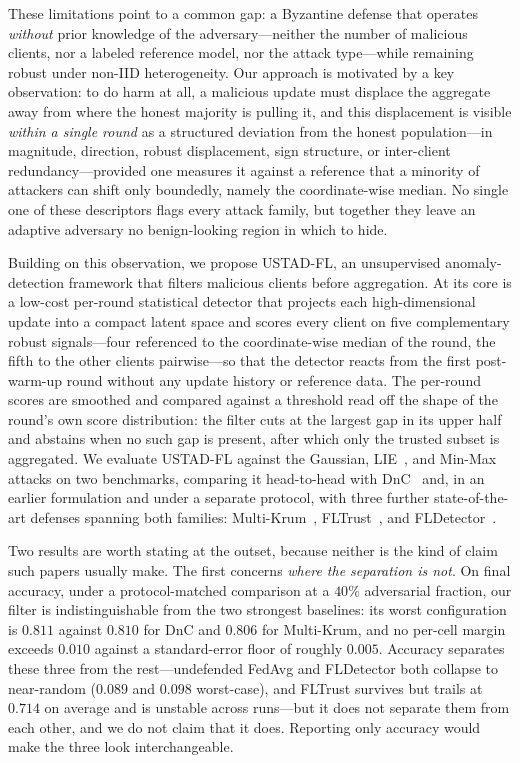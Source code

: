 \documentclass[journal]{IEEEtran}
\begin{document}
These limitations point to a common gap: a Byzantine defense that operates \emph{without} prior knowledge of the adversary---neither the number of malicious clients, nor a labeled reference model, nor the attack type---while remaining robust under non-IID heterogeneity. Our approach is motivated by a key observation: to do harm at all, a malicious update must displace the aggregate away from where the honest majority is pulling it, and this displacement is visible \emph{within a single round} as a structured deviation from the honest population---in magnitude, direction, robust displacement, sign structure, or inter-client redundancy---provided one measures it against a reference that a minority of attackers can shift only boundedly, namely the coordinate-wise median. No single one of these descriptors flags every attack family, but together they leave an adaptive adversary no benign-looking region in which to hide.

Building on this observation, we propose USTAD-FL, an unsupervised anomaly-detection framework that filters malicious clients before aggregation. At its core is a low-cost per-round statistical detector that projects each high-dimensional update into a compact latent space and scores every client on five complementary robust signals---four referenced to the coordinate-wise median of the round, the fifth to the other clients pairwise---so that the detector reacts from the first post-warm-up round without any update history or reference data. The per-round scores are smoothed and compared against a threshold read off the shape of the round's own score distribution: the filter cuts at the largest gap in its upper half and abstains when no such gap is present, after which only the trusted subset is aggregated. We evaluate USTAD-FL against the Gaussian, LIE~\cite{baruch2019little}, and Min-Max~\cite{shejwalkar2021manipulating} attacks on two benchmarks, comparing it head-to-head with DnC~\cite{shejwalkar2021manipulating} and, in an earlier formulation and under a separate protocol, with three further state-of-the-art defenses spanning both families: Multi-Krum~\cite{blanchard2017machine}, FLTrust~\cite{cao2020fltrust}, and FLDetector~\cite{zhang2022fldetector}.

Two results are worth stating at the outset, because neither is the kind of claim such papers usually make. The first concerns \emph{where the separation is not}. On final accuracy, under a protocol-matched comparison at a $40\%$ adversarial fraction, our filter is indistinguishable from the two strongest baselines: its worst configuration is $0.811$ against $0.810$ for DnC and $0.806$ for Multi-Krum, and no per-cell margin exceeds $0.010$ against a standard-error floor of roughly $0.005$. Accuracy separates these three from the rest---undefended FedAvg and FLDetector both collapse to near-random ($0.089$ and $0.098$ worst-case), and FLTrust survives but trails at $0.714$ on average and is unstable across runs---but it does not separate them from each other, and we do not claim that it does. Reporting only accuracy would make the three look interchangeable.
\end{document}
